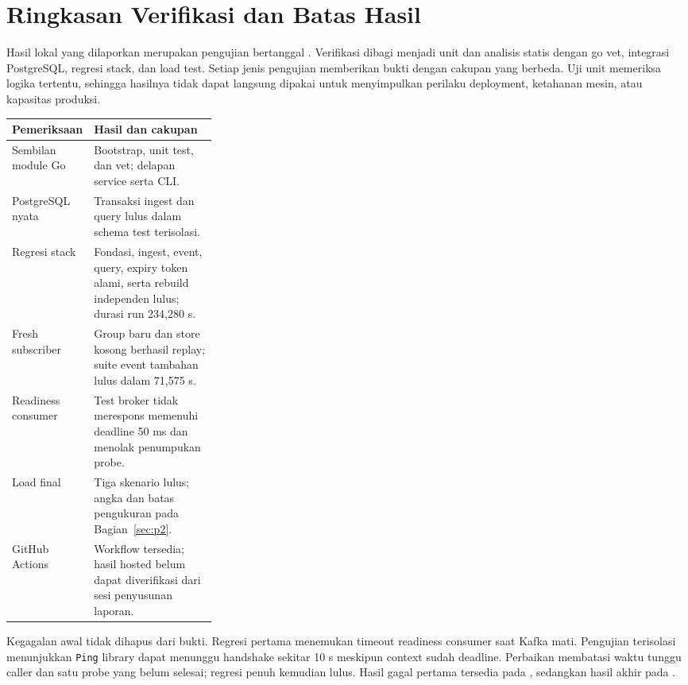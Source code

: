 \section{Ringkasan Verifikasi dan Batas Hasil}
\label{sec:verification}
Hasil lokal yang dilaporkan merupakan pengujian bertanggal \EvidenceDate. Verifikasi dibagi menjadi unit dan analisis statis dengan go vet, integrasi PostgreSQL, regresi stack, dan load test. Setiap jenis pengujian memberikan bukti dengan cakupan yang berbeda. Uji unit memeriksa logika tertentu, sehingga hasilnya tidak dapat langsung dipakai untuk menyimpulkan perilaku deployment, ketahanan mesin, atau kapasitas produksi.

\begin{tabularx}{\linewidth}{P{0.30\linewidth}Y}
\toprule Pemeriksaan & Hasil dan cakupan\\\midrule
Sembilan module Go & Bootstrap, unit test, dan vet; delapan service serta CLI.\\
PostgreSQL nyata & Transaksi ingest dan query lulus dalam schema test terisolasi.\\
Regresi stack & Fondasi, ingest, event, query, expiry token alami, serta rebuild independen lulus; durasi run 234,280 s.\\
Fresh subscriber & Group baru dan store kosong berhasil replay; suite event tambahan lulus dalam 71,575 s.\\
Readiness consumer & Test broker tidak merespons memenuhi deadline 50 ms dan menolak penumpukan probe.\\
Load final & Tiga skenario lulus; angka dan batas pengukuran pada Bagian~\ref{sec:p2}.\\
GitHub Actions & Workflow tersedia; hasil hosted belum dapat diverifikasi dari sesi penyusunan laporan.\\
\bottomrule
\end{tabularx}

Kegagalan awal tidak dihapus dari bukti. Regresi pertama menemukan timeout readiness consumer saat Kafka mati. Pengujian terisolasi menunjukkan \texttt{Ping} library dapat menunggu handshake sekitar 10 s meskipun context sudah deadline. Perbaikan membatasi waktu tunggu caller dan satu probe yang belum selesai; regresi penuh kemudian lulus. Hasil gagal pertama tersedia pada , sedangkan hasil akhir pada .



